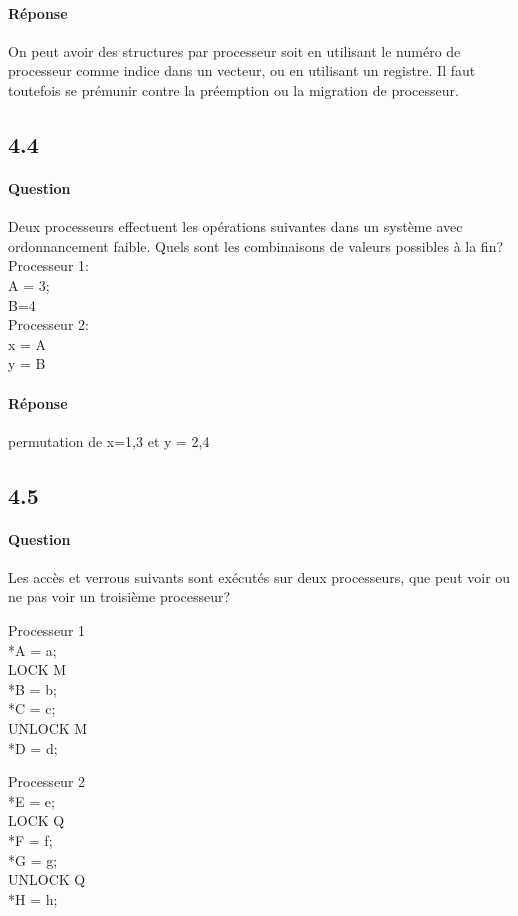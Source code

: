 \documentclass[oneside]{book}
\begin{document}
\paragraph{Réponse}
On peut avoir des structures par processeur soit en utilisant le numéro de
processeur comme indice dans un vecteur, ou en utilisant un registre. Il faut
toutefois se prémunir contre la préemption ou la migration de processeur.

\subsection{4.4}
\paragraph{Question}
Deux processeurs effectuent les opérations suivantes dans un système avec
ordonnancement faible. Quels sont les combinaisons de valeurs possibles à la fin?\\

Processeur 1:\\
A = 3;\\
B=4\\
Processeur 2:\\
x = A\\
y = B\\
\paragraph{Réponse}
permutation de x=1,3 et y = 2,4

\subsection{4.5}
\paragraph{Question}
Les accès et verrous suivants sont exécutés sur deux processeurs, que peut voir
ou ne pas voir un troisième processeur?
\newpage
\begin{multicols}{2}
Processeur 1\\
*A = a;\\
LOCK M\\
*B = b;\\
*C = c;\\
UNLOCK M\\
*D = d;\\
\columnbreak

Processeur 2\\
*E = e;\\
LOCK Q\\
*F = f;\\
*G = g;\\
UNLOCK Q\\
*H = h;\\
\end{multicols}
\end{document}
